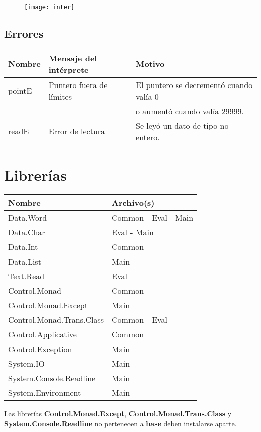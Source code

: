 \documentclass[a4paper, 12pt]{article}
\begin{document}
\begin{figure}[h]
\texttt{[image: inter]}
\centering
\end{figure}

\subsection*{Errores}

\begin{center}
\begin{tabular}{ |l|l|l| } 
 \hline
 Nombre & Mensaje del intérprete & Motivo \\
 \hline
 pointE & Puntero fuera de límites & El puntero se decrementó cuando valía 0 \\
        &                          & o aumentó cuando valía 29999. \\
 readE & Error de lectura & Se leyó un dato de tipo no entero. \\
 \hline
\end{tabular}
\end{center}


\section*{Librerías}

\begin{center}
\begin{tabular}{ |l|l| } 
 \hline
 Nombre & Archivo(s) \\
 \hline
 Data.Word & Common - Eval - Main \\
 Data.Char & Eval - Main \\
 Data.Int & Common \\
 Data.List & Main \\
 Text.Read & Eval \\
 Control.Monad & Common \\
 Control.Monad.Except & Main \\ 
 Control.Monad.Trans.Class & Common - Eval \\
 Control.Applicative & Common \\
 Control.Exception & Main \\ 
 System.IO & Main \\ 
 System.Console.Readline & Main \\ 
 System.Environment & Main \\ 
 \hline
\end{tabular}
\end{center}

Las librerías \textbf{Control.Monad.Except}, \textbf{Control.Monad.Trans.Class} y \textbf{System.Console.Readline} no pertenecen a \textbf{base} deben instalarse aparte.

\newpage
\nocite{*}
\printbibliography[title={Referencias}]
\end{document}
